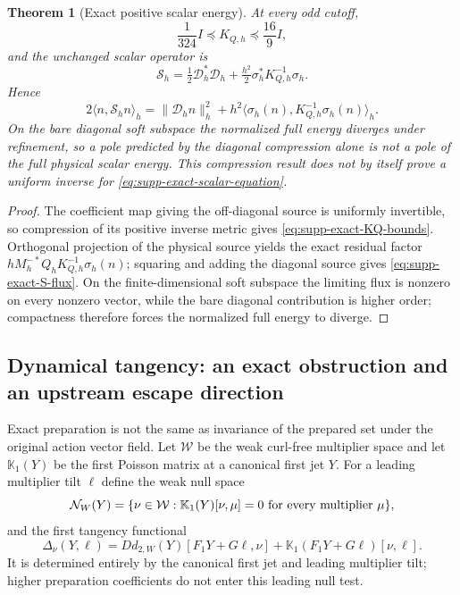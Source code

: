 \documentclass[11pt]{article}
\newtheorem{theorem}{Theorem}[section]
\theoremstyle{definition}
\theoremstyle{remark}
\begin{document}
\begin{theorem}[Exact positive scalar energy]
\label{thm:supp-exact-scalar-flux}
At every odd cutoff,
\begin{equation}
 \frac1{324}I\preceq K_{Q,h}\preceq\frac{16}{9}I,
 \label{eq:supp-exact-KQ-bounds}
\end{equation}
and the unchanged scalar operator is
\begin{equation}
 \boxed{\mathscr S_h
 =\tfrac12\mathscr D_h^*\mathscr D_h
  +\tfrac{h^2}{2}\sigma_h^*K_{Q,h}^{-1}\sigma_h.}
 \label{eq:supp-exact-S-flux}
\end{equation}
Hence
\begin{equation}
 2\langle n,\mathscr S_hn\rangle_h
 =\|\mathscr D_hn\|_h^2
  +h^2\langle\sigma_h(n),K_{Q,h}^{-1}\sigma_h(n)\rangle_h.
 \label{eq:supp-exact-scalar-energy}
\end{equation}
On the bare diagonal soft subspace the normalized full energy diverges under
refinement, so a pole predicted by the diagonal compression alone is not a
pole of the full physical scalar energy.  This compression result does not by
itself prove a uniform inverse for \eqref{eq:supp-exact-scalar-equation}.
\end{theorem}
\begin{proof}
The coefficient map giving the off-diagonal source is uniformly invertible,
so compression of its positive inverse metric gives
\eqref{eq:supp-exact-KQ-bounds}.  Orthogonal projection of the physical
source yields the exact residual factor
$hM_h^{-*}Q_hK_{Q,h}^{-1}\sigma_h(n)$; squaring and adding the diagonal
source gives \eqref{eq:supp-exact-S-flux}.  On the finite-dimensional soft
subspace the limiting flux is nonzero on every nonzero vector, while the
bare diagonal contribution is higher order; compactness therefore forces the
normalized full energy to diverge.
\end{proof}

\subsection{Dynamical tangency: an exact obstruction and an upstream escape direction}

Exact preparation is not the same as invariance of the prepared set under the
original action vector field.  Let $\mathcal W$ be the weak curl-free
multiplier space and let $\mathbb K_1(Y)$ be the first Poisson matrix at a
canonical first jet $Y$.  For a leading multiplier tilt $\ell$ define the
weak null space
\begin{equation}
 \mathcal N_W(Y)=\{\nu\in\mathcal W:
 \mathbb K_1(Y)[\nu,\mu]=0\ \hbox{for every multiplier }\mu\},
 \label{eq:supp-exact-weak-null}
\end{equation}
and the first tangency functional
\begin{equation}
 \boxed{\Delta_\nu(Y,\ell)=
 Dd_{2,W}(Y)[F_1Y+G\ell,\nu]
 +\mathbb K_1(F_1Y+G\ell)[\nu,\ell].}
 \label{eq:supp-exact-tangency-functional}
\end{equation}
It is determined entirely by the canonical first jet and leading multiplier
tilt; higher preparation coefficients do not enter this leading null test.
\end{document}

